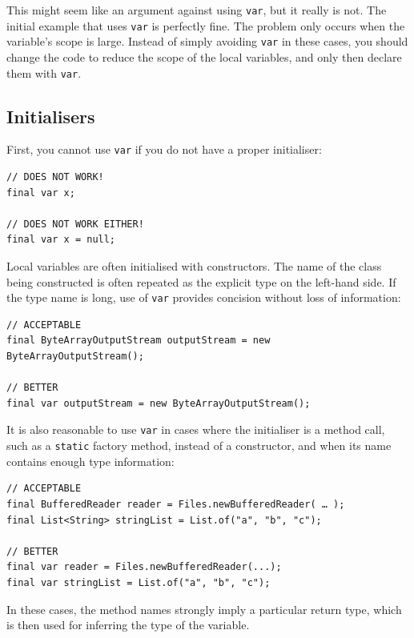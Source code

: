 This might seem like an argument against using \lstinline|var|, but it really is not. The initial example that uses \lstinline|var| is perfectly fine. The problem only occurs when the variable's scope is large. Instead of simply avoiding \lstinline|var| in these cases, you should change the code to reduce the scope of the local variables, and only then declare them with \lstinline|var|.


\subsection{Initialisers}\label{sec:varInitialisers}
First, you cannot use \lstinline|var| if you do not have a proper initialiser:
\begin{lstlisting}
// DOES NOT WORK!
final var x;

// DOES NOT WORK EITHER!
final var x = null;
\end{lstlisting}

Local variables are often initialised with constructors. The name of the class being constructed is often repeated as the explicit type on the left-hand side. If the type name is long, use of \lstinline|var| provides concision without loss of information:
\begin{lstlisting}
// ACCEPTABLE
final ByteArrayOutputStream outputStream = new ByteArrayOutputStream();

// BETTER
final var outputStream = new ByteArrayOutputStream();
\end{lstlisting}

It is also reasonable to use \lstinline|var| in cases where the initialiser is a method call, such as a \lstinline|static| factory method, instead of a constructor, and when its name contains enough type information:
\begin{lstlisting}
// ACCEPTABLE
final BufferedReader reader = Files.newBufferedReader( … );
final List<String> stringList = List.of("a", "b", "c");

// BETTER
final var reader = Files.newBufferedReader(...);
final var stringList = List.of("a", "b", "c");
\end{lstlisting}

In these cases, the method names strongly imply a particular return type, which is then used for inferring the type of the variable.

